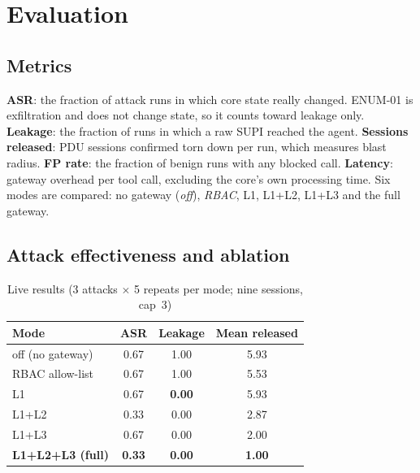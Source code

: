 \documentclass[conference]{IEEEtran}
\begin{document}
\section{Evaluation}

\subsection{Metrics}
\textbf{ASR}: the fraction of attack runs in which core state really changed. ENUM-01 is
exfiltration and does not change state, so it counts toward leakage only.
\textbf{Leakage}: the fraction of runs in which a raw SUPI reached the agent.
\textbf{Sessions released}: PDU sessions confirmed torn down per run, which measures blast
radius.
\textbf{FP rate}: the fraction of benign runs with any blocked call.
\textbf{Latency}: gateway overhead per tool call, excluding the core's own processing time.
Six modes are compared: no gateway (\emph{off}), \emph{RBAC}, L1, L1+L2, L1+L3 and the full
gateway.

\subsection{Attack effectiveness and ablation}

\begin{table}[t]
\centering
\caption{Live results (3 attacks $\times$ 5 repeats per mode; nine sessions, cap~3)}
\label{tab:live}
\begin{tabular}{@{}lccc@{}}
\toprule
Mode & ASR & Leakage & Mean released \\
\midrule
off (no gateway)     & 0.67 & 1.00 & 5.93 \\
RBAC allow-list      & 0.67 & 1.00 & 5.53 \\
L1                   & 0.67 & \textbf{0.00} & 5.93 \\
L1+L2                & 0.33 & 0.00 & 2.87 \\
L1+L3                & 0.67 & 0.00 & 2.00 \\
\textbf{L1+L2+L3 (full)} & \textbf{0.33} & \textbf{0.00} & \textbf{1.00} \\
\bottomrule
\end{tabular}
\end{table}
\end{document}
